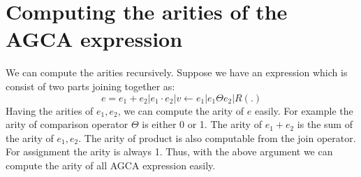 \documentclass[12pt]{article}
\begin{document}
\section{Computing the arities of the AGCA expression}
We can compute the arities recursively. Suppose we have an expression which is consist of two parts joining together as:
\begin{equation*}
e=e_{1}+e_{2}|e_{1}\cdot e_{2}|v\gets e_{1}|e_{1}\Theta e_{2}|R(.)
\end{equation*}
Having the arities of $e_{1},e_{2}$, we can compute the arity of $e$ easily. For example the arity of comparison operator $\Theta$ is either 0 or 1. The arity of $e_{1}+e_{2}$ is the sum of the arity of $e_{1},e_{2}$. The arity of product is also computable from the join operator. For assignment the arity is always 1. Thus, with the above argument we can compute the arity of all AGCA expression easily. 
\end{document}
